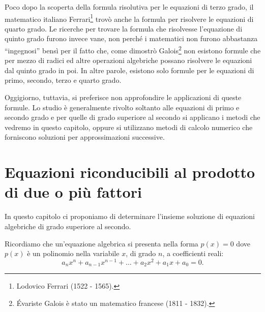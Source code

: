 \begin{exrig}
\begin{esempio}
Poco dopo la scoperta della formula risolutiva per le equazioni di terzo grado, il matematico italiano Ferrari\footnote{Lodovico Ferrari (1522 - 1565).} trovò anche la formula per risolvere le equazioni di quarto grado. Le ricerche per trovare la formula che risolvesse l'equazione di quinto grado furono invece vane, non perché i matematici non furono abbastanza ``ingegnosi'' bensì per il fatto che, come dimostrò Galois\footnote{\'{E}variste Galois è stato un matematico francese (1811 - 1832).} non esistono formule che per mezzo di radici ed altre operazioni algebriche possano risolvere le 
equazioni dal quinto grado in poi. In altre parole, esistono solo formule per le equazioni di primo, secondo, terzo e quarto grado.

Oggigiorno, tuttavia, si preferisce non approfondire le applicazioni di queste formule. Lo studio è generalmente rivolto soltanto alle equazioni di primo e secondo grado e per quelle di grado superiore al secondo si applicano i metodi che vedremo in questo capitolo, oppure si utilizzano metodi di calcolo numerico che forniscono soluzioni per approssimazioni successive.
\end{esempio}
\end{exrig}

\section{Equazioni riconducibili al prodotto di due o più fattori}

In questo capitolo ci proponiamo di determinare l'insieme soluzione di equazioni algebriche di grado superiore al secondo.

Ricordiamo che un'equazione algebrica si presenta nella forma $p(x)=0$ dove $p(x)$ è un polinomio nella variabile $x$, di grado $n$, a coefficienti reali: \[a_nx^n+a_{n-1}x^{n-1}+ \ldots +a_2x^2+a_1x+a_0=0.\]

